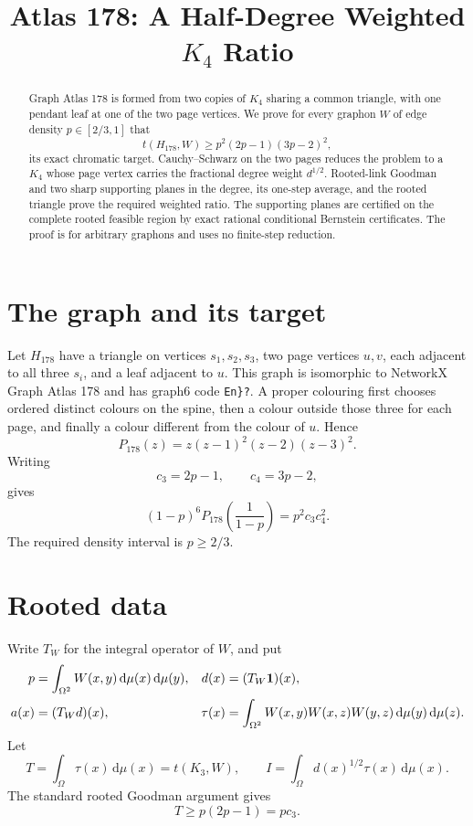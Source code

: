\documentclass[11pt]{article}
\title{Atlas 178: A Half-Degree Weighted \(K_4\) Ratio}
\author{}
\date{}
\newcommand{\dd}{\,\mathrm d}
\newcommand{\one}{\mathbf 1}
\begin{document}
\maketitle

\begin{abstract}
Graph Atlas 178 is formed from two copies of \(K_4\) sharing a common
triangle, with one pendant leaf at one of the two page vertices.  We prove
for every graphon \(W\) of edge density \(p\in[2/3,1]\) that
\[
 t(H_{178},W)\geq p^2(2p-1)(3p-2)^2,
\]
its exact chromatic target.  Cauchy--Schwarz on the two pages reduces the
problem to a \(K_4\) whose page vertex carries the fractional degree weight
\(d^{1/2}\).  Rooted-link Goodman and two sharp supporting planes in the
degree, its one-step average, and the rooted triangle prove the required
weighted ratio.  The supporting planes are certified on the complete
rooted feasible region by exact rational conditional Bernstein
certificates.  The proof is for arbitrary graphons and uses no finite-step
reduction.
\end{abstract}

\section{The graph and its target}

Let \(H_{178}\) have a triangle on vertices \(s_1,s_2,s_3\), two page
vertices \(u,v\), each adjacent to all three \(s_i\), and a leaf adjacent to
\(u\).  This graph is isomorphic to NetworkX Graph Atlas 178 and has graph6
code \verb|En}?|.  A proper colouring first chooses ordered distinct
colours on the spine, then a colour outside those three for each page, and
finally a colour different from the colour of \(u\).  Hence
\[
 P_{178}(z)=z(z-1)^2(z-2)(z-3)^2.
\]
Writing
\[
 c_3=2p-1,\qquad c_4=3p-2,
\]
gives
\begin{equation}
 (1-p)^6P_{178}\!\left(\frac1{1-p}\right)
 =p^2c_3c_4^2.
 \label{eq:target}
\end{equation}
The required density interval is \(p\geq2/3\).

\section{Rooted data}

Write \(T_W\) for the integral operator of \(W\), and put
\begin{align}
 p&=\int_{\Omega^2}W(x,y)\dd\mu(x)\dd\mu(y),
 &d(x)&=(T_W\one)(x),\notag\\
 a(x)&=(T_Wd)(x),
 &\tau(x)&=\int_{\Omega^2}
 W(x,y)W(x,z)W(y,z)\dd\mu(y)\dd\mu(z).
 \label{eq:rooted}
\end{align}
Let
\[
 T=\int_\Omega\tau(x)\dd\mu(x)=t(K_3,W),
\qquad
 I=\int_\Omega d(x)^{1/2}\tau(x)\dd\mu(x).
\]
The standard rooted Goodman argument gives
\begin{equation}
 T\geq p(2p-1)=pc_3.
 \label{eq:goodman}
\end{equation}
\end{document}
